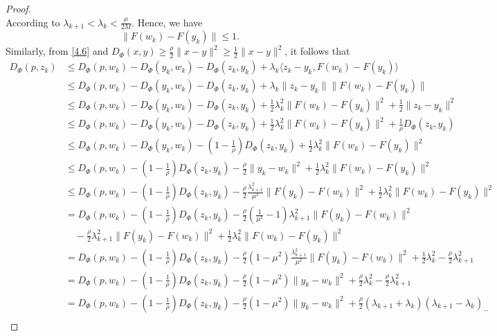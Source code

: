 \documentclass[hidelinks,11 pt]{article}
\numberwithin{equation}{section}
\theoremstyle{definition}  %
\numberwithin{equation}{section}
\numberwithin{theorem}{section}
\begin{document}
\begin{proof}
\begin{equation*}
\end{equation*}
According to $\lambda_{k+1}<\lambda_{k}<\frac{\mu}{2M}$. Hence, we have 
\begin{equation*}
    \|F(w_{k})-F(y_{k})\|\leq 1. 
\end{equation*}
Similarly, from \eqref{4.6} and  $D_{\Phi}(x,y)\geq \frac{\rho}{2}\|x-y\|^2\geq\frac{1}{2}\|x-y\|^2$, it follows that 
\begin{align*}
      D_{\Phi}(p, z_k) 
    &\leq D_{\Phi}(p, w_k) - D_{\Phi}(y_k, w_k) - D_{\Phi}(z_k, y_k) + \lambda_k \langle z_k - y_k, F(w_k) - F(y_k) \rangle\\
    &\leq D_{\Phi}(p, w_k) - D_{\Phi}(y_k, w_k) - D_{\Phi}(z_k, y_k) + \lambda_k \| z_k - y_k\| \|F(w_k) - F(y_k)\|\\
   & \leq D_{\Phi}(p, w_k) - D_{\Phi}(y_k, w_k) - D_{\Phi}(z_k, y_k)+\frac{1}{2}\lambda_{k}^2\|F(w_{k})-F(y_{k})\|^2+\frac{1}{2}\|z_{k}-y_{k}\|^2\\
    & \leq D_{\Phi}(p, w_k) - D_{\Phi}(y_k, w_k) - D_{\Phi}(z_k, y_k)+\frac{1}{2}\lambda_{k}^2\|F(w_{k})-F(y_{k})\|^2+\frac{1}{\rho}D_{\Phi}(z_{k},y_{k})\\
    & \leq D_{\Phi}(p, w_k) - D_{\Phi}(y_k, w_k) - (1-\frac{1}{\rho})D_{\Phi}(z_k, y_k)+\frac{1}{2}\lambda_{k}^2\|F(w_{k})-F(y_{k})\|^2\\
    & \leq D_{\Phi}(p, w_k)-(1-\frac{1}{\rho})D_{\Phi}(z_k, y_k)-\frac{\rho}{2}\|y_{k}-w_{k}\|^2+\frac{1}{2}\lambda_{k}^2\|F(w_{k})-F(y_{k})\|^2\\
     & \leq D_{\Phi}(p, w_k)-(1-\frac{1}{\rho})D_{\Phi}(z_k, y_k)-\frac{\rho}{2}\frac{\lambda_{k+1}^2}{\mu^2}\|F(y_{k})-F(w_{k})\|^2+\frac{1}{2}\lambda_{k}^2\|F(w_{k})-F(y_{k})\|^2\\
     & = D_{\Phi}(p, w_k)-(1-\frac{1}{\rho})D_{\Phi}(z_k, y_k)-\frac{\rho}{2}(\frac{1}{\mu^2}-1)\lambda_{k+1}^2\|F(y_{k})-F(w_{k})\|^2\\
     &\quad -\frac{\rho}{2}\lambda_{k+1}^2\|F(y_{k})-F(w_{k})\|^2+\frac{1}{2}\lambda_{k}^2\|F(w_{k})-F(y_{k})\|^2\\
     &= D_{\Phi}(p, w_k)-(1-\frac{1}{\rho})D_{\Phi}(z_k, y_k)-\frac{\rho}{2}(1-\mu^2)\frac{\lambda_{k+1}^2}{\mu^2}\|F(y_{k})-F(w_{k})\|^2+\frac{1}{2}\lambda_{k}^2-\frac{\rho}{2}\lambda_{k+1}^2\\
       &= D_{\Phi}(p, w_k)-(1-\frac{1}{\rho})D_{\Phi}(z_k, y_k)-\frac{\rho}{2}(1-\mu^2)\|y_{k}-w_{k}\|^2+\frac{\rho}{2}\lambda_{k}^2-\frac{\rho}{2}\lambda_{k+1}^2\\
        &= D_{\Phi}(p, w_k)-(1-\frac{1}{\rho})D_{\Phi}(z_k, y_k)-\frac{\rho}{2}(1-\mu^2)\|y_{k}-w_{k}\|^2 +\frac{\rho}{2}(\lambda_{k+1}+\lambda_{k})(\lambda_{k+1}-\lambda_{k})_{-}\\

\end{align*}
\end{proof}
\end{document}
